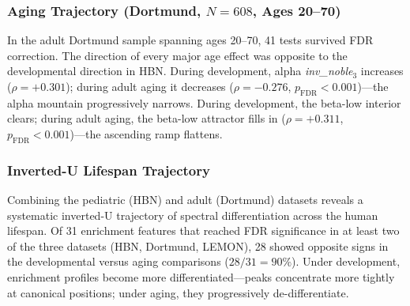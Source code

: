 \subsubsection{Aging Trajectory (Dortmund, $N = 608$, Ages 20--70)}
\label{sec:aging}

In the adult Dortmund sample spanning ages 20--70, 41 tests survived FDR correction. The direction of every major age effect was opposite to the developmental direction in HBN. During development, alpha \textit{inv\_noble$_3$} increases ($\rho = +0.301$); during adult aging it decreases ($\rho = -0.276$, $p_\text{FDR} < 0.001$)---the alpha mountain progressively narrows. During development, the beta-low interior clears; during adult aging, the beta-low attractor fills in ($\rho = +0.311$, $p_\text{FDR} < 0.001$)---the ascending ramp flattens.

\subsubsection{Inverted-U Lifespan Trajectory}
\label{sec:lifespan}

Combining the pediatric (HBN) and adult (Dortmund) datasets reveals a systematic inverted-U trajectory of spectral differentiation across the human lifespan. Of 31 enrichment features that reached FDR significance in at least two of the three datasets (HBN, Dortmund, LEMON), 28 showed opposite signs in the developmental versus aging comparisons ($28/31 = 90\%$). Under development, enrichment profiles become more differentiated---peaks concentrate more tightly at canonical positions; under aging, they progressively de-differentiate.

